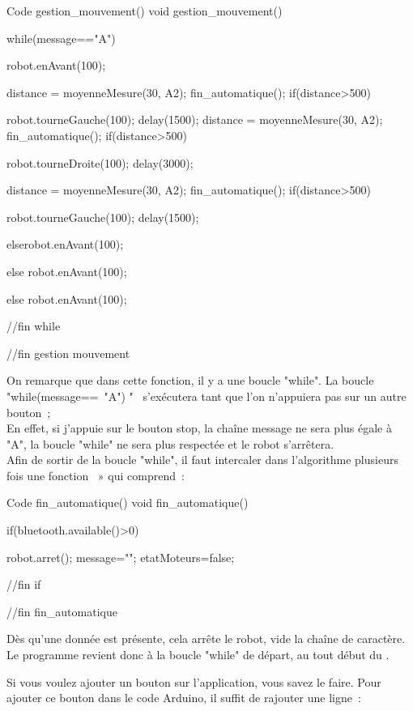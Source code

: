 \begin{Cpp}{Code gestion\_mouvement()}
 void gestion_mouvement() {

  while(message=="A") {

  robot.enAvant(100);
    
    distance = moyenneMesure(30, A2);
    fin_automatique(); 
    if(distance>500) {

      robot.tourneGauche(100);
      delay(1500);
      distance = moyenneMesure(30, A2);
      fin_automatique(); 
      if(distance>500) {

        robot.tourneDroite(100);
        delay(3000);

        distance = moyenneMesure(30, A2);
        fin_automatique(); 
        if(distance>500) {

            robot.tourneGauche(100);
            delay(1500);
        }
        else{robot.enAvant(100);}

      }                
      else  {robot.enAvant(100);}   

    }
     else {robot.enAvant(100);}  

 }//fin while
 }//fin gestion mouvement
\end{Cpp}


On remarque que dans cette fonction, il y a une boucle "while".
La boucle "while(message== "A") {}"  s’exécutera tant que l'on n’appuiera pas sur un autre bouton ;\\ 
En effet, si j'appuie sur le bouton stop, la chaîne message ne sera plus égale à "A", la boucle "while" ne sera plus respectée et le robot s’arrêtera. \\

Afin de sortir de la boucle "while", il faut intercaler dans l'algorithme plusieurs fois une fonction  » qui comprend :

\begin{Cpp}{Code fin\_automatique()}
 void fin_automatique() {

if(bluetooth.available()>0) {
  robot.arret();
  message="";
  etatMoteurs=false;

}//fin if

}//fin fin_automatique

\end{Cpp}

Dès qu'une donnée est présente, cela arrête le robot, vide la chaîne de caractère. Le programme revient donc à la boucle "while" de départ, au tout début du .

Si vous voulez ajouter un bouton sur l'application, vous savez le faire.
Pour ajouter ce bouton dans le code Arduino, il suffit de rajouter une ligne :

